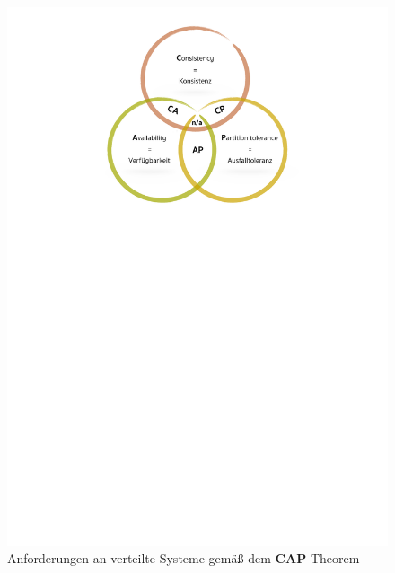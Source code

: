 \begin{figure}[H]
\centering
\includegraphics[trim = 0mm 189mm 0mm 9mm, clip, width=1.0\textwidth]{resources/myPictureForCAP}
\caption[\textbf{CAP}-Theorem]{Anforderungen an verteilte Systeme gemäß dem \textbf{CAP}-Theorem}
\label{img:cap}
\end{figure}

